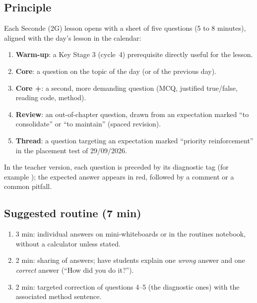 \subsection*{Principle}
Each Seconde (2G) lesson opens with a sheet of five questions (5 to 8 minutes), aligned with the day's lesson in the calendar:
\begin{enumerate}[label=\textbf{\arabic*.},leftmargin=1.6em]
  \item \textbf{Warm-up}: a Key Stage 3 (cycle~4) prerequisite directly useful for the lesson.
  \item \textbf{Core}: a question on the topic of the day (or of the previous day).
  \item \textbf{Core +}: a second, more demanding question (MCQ, justified true/false, reading code, method).
  \item \textbf{Review}: an out-of-chapter question, drawn from an expectation marked ``to consolidate'' or ``to maintain'' (spaced revision).
  \item \textbf{Thread}: a question targeting an expectation marked ``priority reinforcement'' in the placement test of 29/09/2026.
\end{enumerate}
In the teacher version, each question is preceded by its diagnostic tag (for example ); the expected answer appears in red, followed by a comment or a common pitfall.

\subsection*{Suggested routine (7 min)}
\begin{enumerate}[label=\textbf{\arabic*.},leftmargin=1.6em]
  \item 3 min: individual answers on mini-whiteboards or in the routines notebook, without a calculator unless stated.
  \item 2 min: sharing of answers; have students explain one \emph{wrong} answer and one \emph{correct} answer (``How did you do it?'').
  \item 2 min: targeted correction of questions 4--5 (the diagnostic ones) with the associated method sentence.
\end{enumerate}

